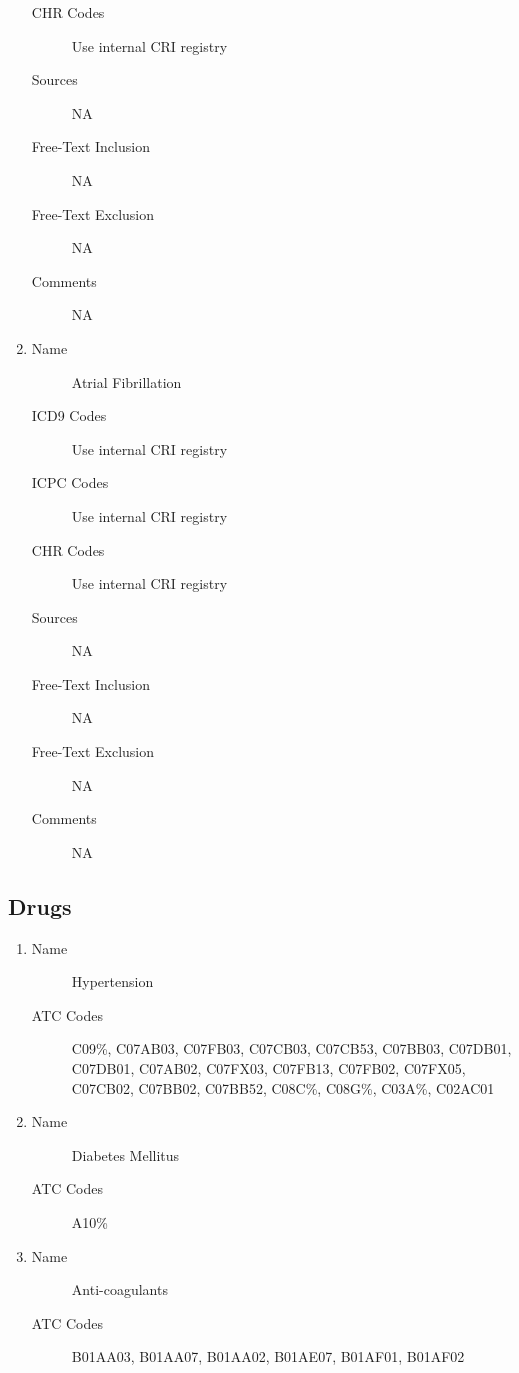 \documentclass[a4paper,12pt]{article}
\begin{document}
\begin{appendices}
\begin{enumerate}
\begin{description}
   						\item[CHR Codes] Use internal CRI registry
   						\item[Sources] NA
   						\item[Free-Text Inclusion] NA
   						\item[Free-Text Exclusion] NA
   						\item[Comments] NA
   					\end{description}
   					\item
   					\begin{description}
   						\item[Name] Atrial Fibrillation
   						\item[ICD9 Codes] Use internal CRI registry
   						\item[ICPC Codes] Use internal CRI registry
   						\item[CHR Codes] Use internal CRI registry
   						\item[Sources] NA
   						\item[Free-Text Inclusion] NA
   						\item[Free-Text Exclusion] NA
   						\item[Comments] NA
   					\end{description}
	   			\end{enumerate}
   			
   			\subsection{Drugs}
   				\begin{enumerate}
   					\item
   					\begin{description}
   						\item[Name] Hypertension
   						\item[ATC Codes] C09\%, C07AB03, C07FB03, C07CB03, C07CB53, C07BB03, C07DB01, C07DB01, C07AB02, C07FX03, C07FB13, C07FB02, C07FX05, C07CB02, C07BB02, C07BB52, C08C\%, C08G\%, C03A\%, C02AC01
   					\end{description}
   					\item
   					\begin{description}
   						\item[Name] Diabetes Mellitus
   						\item[ATC Codes] A10\%
   					\end{description}
   					\item
   					\begin{description}
   						\item[Name] Anti-coagulants
   						\item[ATC Codes] B01AA03, B01AA07, B01AA02, B01AE07, B01AF01, B01AF02
   					\end{description}
   				\end{enumerate}
   				\newpage
   		

\end{appendices}
\end{document}
